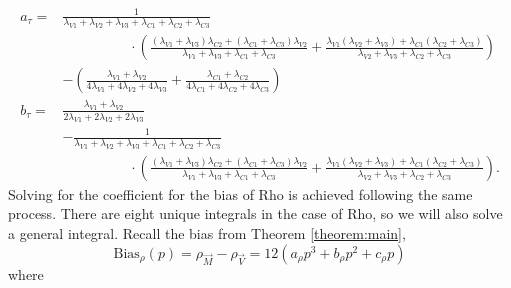 {\footnotesize
\begin{align*}
    a_{\tau}=&\frac{1}{\lambda_{V1}+\lambda_{V2}+\lambda_{V3}+\lambda_{C1}+\lambda_{C2}+\lambda_{C3}}\\
    &\hspace{2cm}\cdot\left(\frac{\left(\lambda_{V1}+\lambda_{V3}\right)\lambda_{C2}+\left(\lambda_{C1}+\lambda_{C3}\right)\lambda_{V2}}{\lambda_{V1}+\lambda_{V3}+\lambda_{C1}+\lambda_{C3}}+\frac{\lambda_{V1}\left(\lambda_{V2}+\lambda_{V3}\right)+\lambda_{C1}\left(\lambda_{C2}+\lambda_{C3}\right)}{\lambda_{V2}+\lambda_{V3}+\lambda_{C2}+\lambda_{C3}}\right)\\
    &-\left(\frac{\lambda_{V1}+\lambda_{V2}}{4\lambda_{V1}+4\lambda_{V2}+4\lambda_{V3}}+\frac{\lambda_{C1}+\lambda_{C2}}{4\lambda_{C1}+4\lambda_{C2}+4\lambda_{C3}}\right)\\
    b_{\tau}=&\frac{\lambda_{V1}+\lambda_{V2}}{2\lambda_{V1}+2\lambda_{V2}+2\lambda_{V3}}\\        &-\frac{1}{\lambda_{V1}+\lambda_{V2}+\lambda_{V3}+\lambda_{C1}+\lambda_{C2}+\lambda_{C3}}\\
    &\hspace{2cm}\cdot\left(\frac{\left(\lambda_{V1}+\lambda_{V3}\right)\lambda_{C2}+\left(\lambda_{C1}+\lambda_{C3}\right)\lambda_{V2}}{\lambda_{V1}+\lambda_{V3}+\lambda_{C1}+\lambda_{C3}}+\frac{\lambda_{V1}\left(\lambda_{V2}+\lambda_{V3}\right)+\lambda_{C1}\left(\lambda_{C2}+\lambda_{C3}\right)}{\lambda_{V2}+\lambda_{V3}+\lambda_{C2}+\lambda_{C3}}\right).
\end{align*}}
Solving for the coefficient for the bias of Rho is achieved following the same process. There are eight unique integrals in the case of Rho, so we will also solve a general integral. Recall the bias from Theorem \ref{theorem:main}, $$\text{Bias}_{\rho}(p)=\rho_{\vec{M}}-\rho_{\vec{V}}=12\left(a_{\rho}p^3+b_{\rho}p^2+c_{\rho}p\right)$$ where
